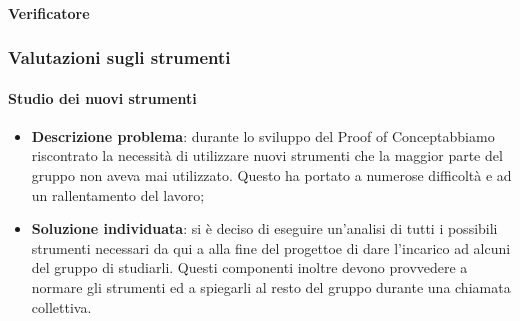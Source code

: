 			\paragraph{Verificatore}
		\subsubsection{Valutazioni sugli strumenti}
			\paragraph{Studio dei nuovi strumenti}
				\begin{itemize}
					\item \textbf{Descrizione problema}: durante lo sviluppo del Proof of Concept\glosp abbiamo riscontrato la necessità di utilizzare nuovi strumenti che la maggior parte del gruppo non aveva mai utilizzato. Questo ha portato a numerose difficoltà e ad un rallentamento del lavoro;
					\item \textbf{Soluzione individuata}: si è deciso di eseguire un'analisi di tutti i possibili strumenti necessari da qui a alla fine del progetto\glosp e di dare l'incarico ad alcuni del gruppo di studiarli. Questi componenti inoltre devono provvedere a normare gli strumenti ed a spiegarli al resto del gruppo durante una chiamata collettiva.
				\end{itemize}